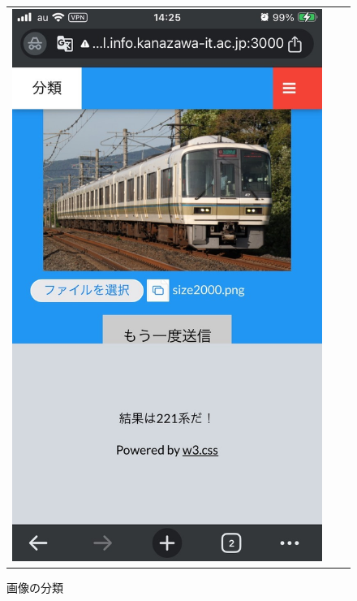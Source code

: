 \begin{figure}[H]
	\begin{tabular}{ccc}
		\begin{minipage}[b]{0.3\textwidth}
			\centering
			\includegraphics[width=\linewidth]{chap2/fig/img_classify.jpg}
			\caption{画像の分類}
			\label{img_cls}
		\end{minipage}
		\begin{minipage}[b]{0.3\textwidth}
			\centering

\end{minipage}
\end{tabular}
\end{figure}
